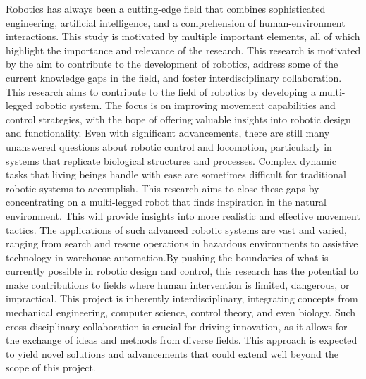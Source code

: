 Robotics has always been a cutting-edge field that combines sophisticated engineering, artificial intelligence, and a comprehension of human-environment interactions.
This study is motivated by multiple important elements, all of which highlight the importance and relevance of the research.
This research is motivated by the aim to contribute to the development of robotics, address some of the current knowledge gaps in the field, and foster interdisciplinary collaboration.
This research aims to contribute to the field of robotics by developing a multi-legged robotic system.
The focus is on improving movement capabilities and control strategies, with the hope of offering valuable insights into robotic design and functionality.
Even with significant advancements, there are still many unanswered questions about robotic control and locomotion, particularly in systems that replicate biological structures and processes.
Complex dynamic tasks that living beings handle with ease are sometimes difficult for traditional robotic systems to accomplish. This research aims to close these gaps by concentrating on a multi-legged robot that finds inspiration in the natural environment. This will provide insights into more realistic and effective movement tactics. The applications of such advanced robotic systems are vast and varied, ranging from search and rescue operations in hazardous environments to assistive technology in warehouse automation.By pushing the boundaries of what is currently possible in robotic design and control, this research has the potential to make contributions to fields where human intervention is limited, dangerous, or impractical. This project is inherently interdisciplinary, integrating concepts from mechanical engineering, computer science, control theory, and even biology. Such cross-disciplinary collaboration is crucial for driving innovation, as it allows for the exchange of ideas and methods from diverse fields. This approach is expected to yield novel solutions and advancements that could extend well beyond the scope of this project.


